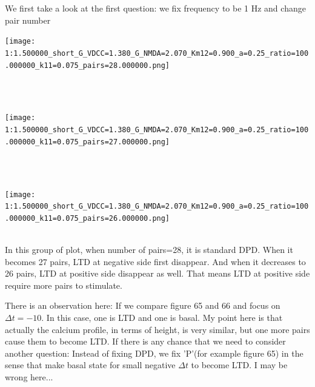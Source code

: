 \documentclass{article}
\begin{document}
We first take a look at the first question: we fix frequency to be 1 Hz and change pair number\\
\begin{minipage}{\textwidth} %
    \centering
    \texttt{[image: 1:1.500000\_short\_G\_VDCC=1.380\_G\_NMDA=2.070\_Km12=0.900\_a=0.25\_ratio=100.000000\_k11=0.075\_pairs=28.000000.png]} %
    \label{fig:a0.25}
\end{minipage}\\
\\
\begin{minipage}{\textwidth} %
    \centering
    \texttt{[image: 1:1.500000\_short\_G\_VDCC=1.380\_G\_NMDA=2.070\_Km12=0.900\_a=0.25\_ratio=100.000000\_k11=0.075\_pairs=27.000000.png]} %
    \label{fig:a0.25}
\end{minipage}\\
\\
\begin{minipage}{\textwidth} %
    \centering
    \texttt{[image: 1:1.500000\_short\_G\_VDCC=1.380\_G\_NMDA=2.070\_Km12=0.900\_a=0.25\_ratio=100.000000\_k11=0.075\_pairs=26.000000.png]} %
    \label{fig:a0.25}
\end{minipage}\\
In this group of plot, when number of pairs=28, it is standard DPD. When it becomes 27 pairs, LTD at negative side first disappear. And when it decreases to 26 pairs, LTD at positive side disappear as well. That means LTD at positive side require more pairs to stimulate. 

There is an observation here: If we compare figure 65 and 66 and focus on $\Delta t=-10$. In this case, one is LTD and one is basal. My point here is that actually the calcium profile, in terms of height, is very similar, but one more pairs cause them to become LTD. If there is any chance that we need to consider another question: Instead of fixing DPD, we fix 'P'(for example figure 65) in the sense that make basal state for small negative $\Delta t$ to become LTD. I may be wrong here...
\end{document}
